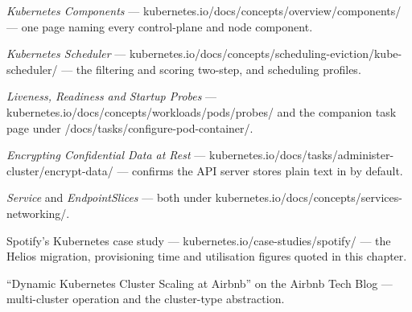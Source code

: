 \begin{iqbox}
\end{iqbox}

\begin{wbitem}
  \item \emph{Kubernetes Components} --- kubernetes.io/docs/concepts/overview/components/ --- one page naming every control-plane and node component.
  \item \emph{Kubernetes Scheduler} --- kubernetes.io/docs/concepts/scheduling-eviction/kube-scheduler/ --- the filtering and scoring two-step, and scheduling profiles.
  \item \emph{Liveness, Readiness and Startup Probes} --- kubernetes.io/docs/concepts/workloads/pods/probes/ and the companion task page under /docs/tasks/configure-pod-container/.
  \item \emph{Encrypting Confidential Data at Rest} --- kubernetes.io/docs/tasks/administer-cluster/encrypt-data/ --- confirms the API server stores plain text in  by default.
  \item \emph{Service} and \emph{EndpointSlices} --- both under kubernetes.io/docs/concepts/services-networking/.
  \item Spotify's Kubernetes case study --- kubernetes.io/case-studies/spotify/ --- the Helios migration, provisioning time and utilisation figures quoted in this chapter.
  \item ``Dynamic Kubernetes Cluster Scaling at Airbnb'' on the Airbnb Tech Blog --- multi-cluster operation and the cluster-type abstraction.
\end{wbitem}

